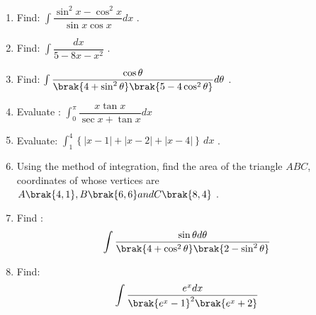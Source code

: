 \begin{enumerate}
\item Find: $\int \dfrac{\sin^2 x-\cos^2 x}{\sin x \cos x}dx$ .
\item Find: $\int\dfrac{dx}{5-8x-x^2}$ .
\item Find: $\int\dfrac{\cos \theta}{\brak{4+ \sin^2 \theta}\brak{5-4\cos^2 \theta}} d\theta$ .
\item Evaluate : $\int_{0}^{\pi}\dfrac{x\tan x}{\sec x+\tan x}dx$
 \item Evaluate: $\int_{1}^{4} \left\{ |x-1| + |x-2| + |x-4| \right\} \,dx$ .
 \item Using the method of integration, find the area of the triangle $ABC$, coordinates of whose vertices are $A\brak{4, 1}, B\brak{6, 6} and C\brak{8, 4}$ .
 \item Find :\begin{align*}\int\dfrac{\sin\theta d\theta}{\brak{4+\cos^{2}\theta}\brak{2-\sin^{2}\theta}}\end{align*}
 \item Find:
\begin{align*}
\int \dfrac{{e}^{x}dx}{{{\brak{{{e}^{x}-1}}^{2}}{\brak{{e}^{x}+2}}}}
\end{align*}
\end{enumerate}

